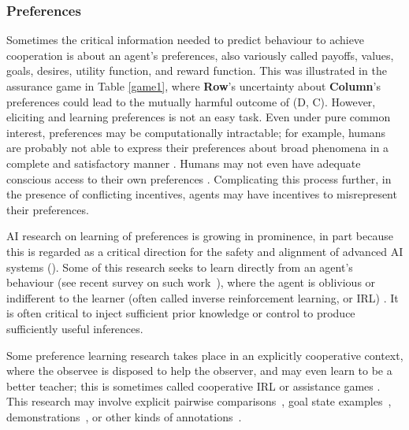 \documentclass[11pt, a4paper, logo, onecolumn, nonumbering]{deepmind}
\begin{document}
\subsubsection{Preferences}
Sometimes the critical information needed to predict behaviour to achieve cooperation is about an agent's preferences, also variously called payoffs, values, goals, desires, utility function, and reward function. This was illustrated in the assurance game in Table \ref{game1}, where \textbf{Row}'s uncertainty about \textbf{Column}'s preferences could lead to the mutually harmful outcome of (D, C). However, eliciting and learning preferences is not an easy task. Even under pure common interest, preferences may be computationally intractable; for example, humans are probably not able to express their preferences about broad phenomena in a complete and satisfactory manner \cite{bostrom2014superintelligence, russell2019human}.
Humans may not even have adequate conscious access to their own preferences \cite[138]{russell2019human}. %
Complicating this process further, in the presence of conflicting incentives, agents may have incentives to misrepresent their preferences. 

AI research on learning of preferences is growing in prominence, in part because this is regarded as a critical direction for the safety and alignment of advanced AI systems (\cite{russell2015research, christiano2017deep}). %
 Some of this research seeks to learn directly from an agent's behaviour (see recent survey on such work~\cite{albrecht2018autonomous}), where the agent is oblivious or indifferent to the learner (often called inverse reinforcement learning, or IRL) \cite{ng2000algorithms}. It is often critical to inject sufficient prior knowledge \cite{armstrong2018occam} or control \cite{amin2017repeated, sadigh2016information} to produce sufficiently useful inferences. 
 


Some preference learning research takes place in an explicitly cooperative context, where the observee is disposed to help the observer, and may even learn to be a better teacher; this is sometimes called cooperative IRL \cite{hadfield2016cooperative} or assistance games \cite{shah2020neurips}. 
This research may involve explicit pairwise comparisons~\cite{akrour2012april,christiano2017deep,kreutzer2018reliability, stiennon2020learning}, goal state examples~\cite{bahdanau2018learning},  demonstrations~\cite{ibarz2018reward,tung2018reward,brown2019extrapolating}, or other kinds of annotations~\cite{jeon2020reward}. 
\end{document}
